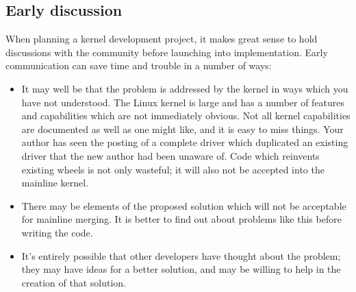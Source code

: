 \documentclass[a4paper,8pt,english]{sphinxmanual}
\begin{document}
\subsection{Early discussion}
\label{process/3.Early-stage:early-discussion}
When planning a kernel development project, it makes great sense to hold
discussions with the community before launching into implementation.  Early
communication can save time and trouble in a number of ways:
\begin{itemize}
\item {} 
It may well be that the problem is addressed by the kernel in ways which
you have not understood.  The Linux kernel is large and has a number of
features and capabilities which are not immediately obvious.  Not all
kernel capabilities are documented as well as one might like, and it is
easy to miss things.  Your author has seen the posting of a complete
driver which duplicated an existing driver that the new author had been
unaware of.  Code which reinvents existing wheels is not only wasteful;
it will also not be accepted into the mainline kernel.

\item {} 
There may be elements of the proposed solution which will not be
acceptable for mainline merging.  It is better to find out about
problems like this before writing the code.

\item {} 
It's entirely possible that other developers have thought about the
problem; they may have ideas for a better solution, and may be willing
to help in the creation of that solution.

\end{itemize}
\end{document}
